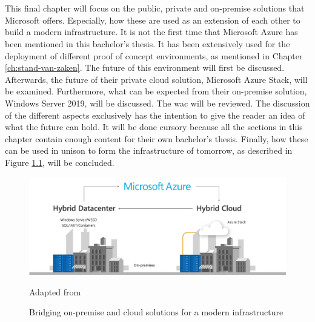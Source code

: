 \chapter{}
\label{ch:toekomstvisie}
This final chapter will focus on the public, private and on-premise solutions that Microsoft offers. 
Especially, how these are used as an extension of each other to build a modern infrastructure. 
It is not the first time that Microsoft Azure has been mentioned in this bachelor's thesis. 
It has been extensively used for the deployment of different proof of concept environments, as mentioned in Chapter \ref{ch:stand-van-zaken}. 
The future of this environment will first be discussed. 
Afterwards, the future of their private cloud solution, Microsoft Azure Stack, will be examined. 
Furthermore, what can be expected from their on-premise solution, Windows Server 2019, will be discussed. 
The \acrlong{wac} will be reviewed. 
The discussion of the different aspects exclusively has the intention to give the reader an idea of what the future can hold. 
It will be done cursory because all the sections in this chapter contain enough content for their own bachelor's thesis. 
Finally, how these can be used in unison to form the infrastructure of tomorrow, as described in Figure \ref{fig:Azure_FullCircle}, will be concluded.

\begin{figure}[h]
	\captionsetup{width=0.6\linewidth}
	\includegraphics[width=0.7\linewidth]{img/Toekomstvisie/Azure1.png}
	\centering
	\caption[Modern infrastructure]{Bridging on-premise and cloud solutions for a modern infrastructure}
	\scriptsize	
	Adapted from \cite{Singh2019}
	\label{fig:Azure_FullCircle}
\end{figure}

\clearpage

